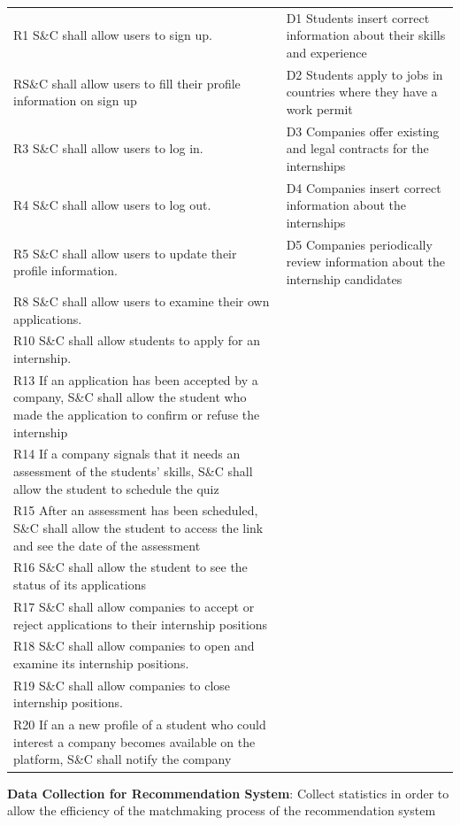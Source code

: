 \begin{enumerate}[label={[G\arabic*]}]
\begin{longtable}{|p{8cm}|p{8cm}|}
R1 S\&C shall allow users to sign up. & D1 Students insert correct information about their skills and experience \\
RS\&C shall allow users to fill their profile information on sign up & D2 Students apply to jobs in countries where they have a work permit \\
R3 S\&C shall allow users to log in. & D3 Companies offer existing and legal contracts for the internships \\
R4 S\&C shall allow users to log out. & D4 Companies insert correct information about the internships \\
R5 S\&C shall allow users to update their profile information. & D5 Companies periodically review information about the internship candidates \\
R8 S\&C shall allow users to examine their own applications. & \\
R10 S\&C shall allow students to apply for an internship.     & \\
R13 If an application has been accepted by a company, S\&C shall allow the student who made the application to confirm or refuse the internship & \\
R14 If a company signals that it needs an assessment of the students' skills, S\&C shall allow the student to schedule the quiz & \\
R15 After an assessment has been scheduled, S\&C shall allow the student to access the link and see the date of the assessment & \\
R16 S\&C shall allow the student to see the status of its applications & \\
R17 S\&C shall allow companies to accept or reject applications to their internship positions & \\
R18 S\&C shall allow companies to open and examine its internship positions. & \\
R19 S\&C shall allow companies to close internship positions. & \\
R20 If an a new profile of a student who could interest a company becomes available on the platform, S\&C shall notify the company & \\


\end{longtable}

\newpage
\item \textbf{Data Collection for Recommendation System}: 
                Collect statistics in order to allow the efficiency of the matchmaking process of the recommendation system 



\end{enumerate}
